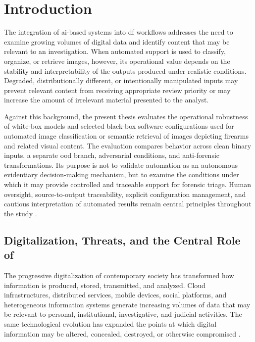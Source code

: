 \chapter{Introduction}
\label{chap:introduction}

The integration of \gls{ai}-based systems into \gls{df} workflows addresses
the need to examine growing volumes of digital data and identify content that
may be relevant to an investigation. When automated support is used to
classify, organize, or retrieve images, however, its operational value depends
on the stability and interpretability of the outputs produced under realistic
conditions. Degraded, distributionally different, or intentionally manipulated
inputs may prevent relevant content from receiving appropriate review priority
or may increase the amount of irrelevant material presented to the analyst.

Against this background, the present thesis evaluates the operational
robustness of white-box models and selected black-box software
configurations used for automated image classification or semantic retrieval of
images depicting firearms and related visual content. The evaluation compares
behavior across clean binary inputs, a separate \gls{ood} branch, adversarial
conditions, and anti-forensic transformations. Its purpose is not to validate
automation as an autonomous evidentiary decision-making mechanism, but to
examine the conditions under which it may provide controlled and traceable
support for forensic triage. Human oversight, source-to-output traceability,
explicit configuration management, and cautious interpretation of automated
results remain central principles throughout the study
\cite{costantini2019digital,sanna2024preliminary,sanna2025pixelperfect}.

\section[Digitalization, Threats, and the Central Role of Digital Forensics]
{Digitalization, Threats, and the Central Role of }

The progressive digitalization of contemporary society has transformed how
information is produced, stored, transmitted, and analyzed. Cloud
infrastructures, distributed services, mobile devices, social platforms, and
heterogeneous information systems generate increasing volumes of data that may
be relevant to personal, institutional, investigative, and judicial activities.
The same technological evolution has expanded the points at which digital
information may be altered, concealed, destroyed, or otherwise compromised
\cite{garfinkel2010digital,casey2011digital}.


